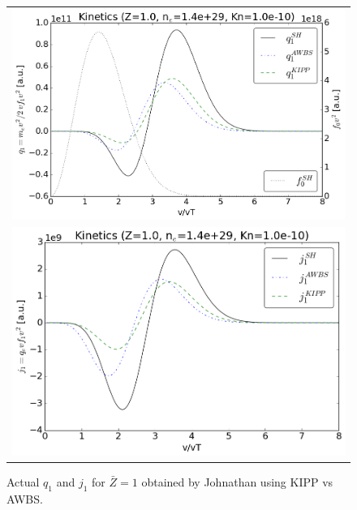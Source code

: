 \documentclass[preprint,12pt]{elsarticle}
\newcommand{\Zbar}{\bar{Z}}
\begin{document}
\begin{figure}[tbh]
  \begin{center}
    \begin{tabular}{c}
      \includegraphics[width=1.0\textwidth]{../VFPdata/KIPP_q_kinetics.png} \\
      \includegraphics[width=1.0\textwidth]{../VFPdata/KIPP_j_kinetics.png}
    \end{tabular}
  \caption{Actual $q_1$ and $j_1$ for $\Zbar=1$ obtained by Johnathan using KIPP vs AWBS.
  }
  \end{center}
  \label{fig:AWBScorrection_f1}
\end{figure}
\end{document}
